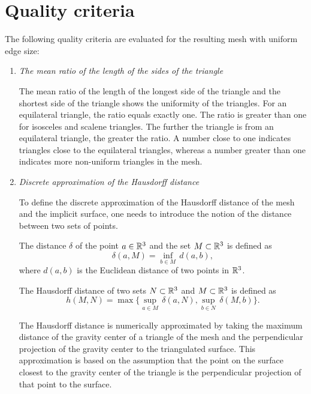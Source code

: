 \section{Quality criteria}
\label{sub4.1}

The following quality criteria \cite{korecova2021triangulation} are evaluated 
for the resulting mesh with uniform edge size:

\begin{enumerate}
    \item \textit{The mean ratio of the length of the sides of the triangle}
    
    The mean ratio of the length of the longest side of the triangle
    and the shortest side of the triangle shows the uniformity of the 
    triangles. 
    For an equilateral triangle, the ratio equals exactly one. The ratio is
    greater than one for isosceles and scalene triangles. 
    The further the triangle is from an equilateral triangle, the greater the ratio.
    A number close to one indicates triangles close to the equilateral triangles,
    whereas a number greater than one indicates more non-uniform triangles in the mesh.

    \item \textit{Discrete approximation of the Hausdorff distance}
    
    To define the discrete approximation of the Hausdorff distance of the mesh and
    the implicit surface, one needs to introduce the notion of the distance between two sets
    of points.
\begin{definition} The distance $\delta$ of the point $a\in \mathbb{R}^3$ and the set
    $M \subset \mathbb{R}^3$ is defined as 
    \begin{equation}
        \delta(a, M) = \inf_{b \in M} \, d(a, b),
    \end{equation}
    where $d(a, b)$ is the Euclidean distance of two points in $\mathbb{R}^3$. 
\end{definition}
\begin{definition} The Hausdorff distance of two sets $N \subset \mathbb{R}^3$ and
    $M \subset \mathbb{R}^3$ is defined as
    \begin{equation}
        h(M, N) = \max \big \{\sup_{a \in M} \, \delta(a, N), \sup_{b \in N} \, \delta(M, b) \big \}.
    \end{equation}
\end{definition}
    The Hausdorff distance is numerically approximated by taking the maximum distance
    of the gravity center of a triangle of the mesh and the perpendicular projection of
    the gravity center to the triangulated surface.
    This approximation is based on the assumption that the point on the surface
    closest to the gravity center of the triangle is the perpendicular projection of
    that point to the surface.


\end{enumerate}
